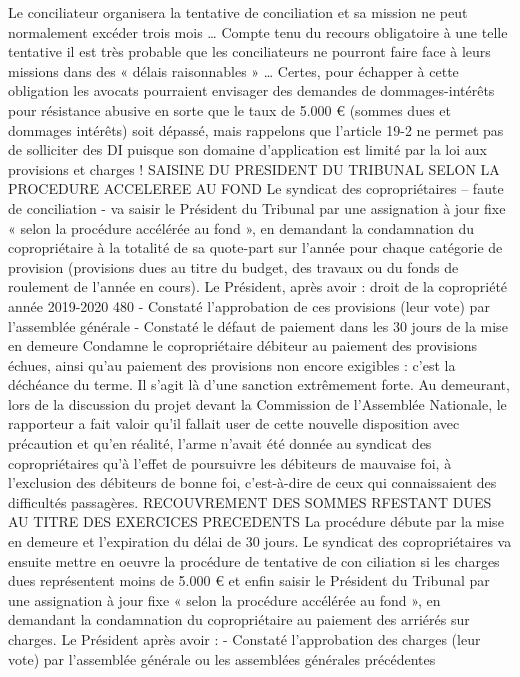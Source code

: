 Le conciliateur organisera la tentative de conciliation et sa mission ne peut normalement excéder trois mois …
Compte tenu du recours obligatoire à une telle tentative il est très probable que les conciliateurs ne pourront faire face à leurs missions dans des « délais raisonnables » …
Certes, pour échapper à cette obligation les avocats pourraient envisager des demandes de dommages-intérêts pour résistance abusive en sorte que le taux de 5.000 € (sommes dues et dommages intérêts) soit dépassé, mais rappelons que l’article 19-2 ne permet pas de solliciter des DI puisque son domaine d’application est limité par la loi aux provisions et charges !
SAISINE DU PRESIDENT DU TRIBUNAL SELON LA PROCEDURE ACCELEREE AU FOND
Le syndicat des copropriétaires – faute de conciliation - va saisir le Président du Tribunal par une assignation à jour fixe « selon la procédure accélérée au fond », en demandant la condamnation du copropriétaire à la totalité de sa quote-part sur l’année pour chaque catégorie de provision (provisions dues au titre du budget, des travaux ou du fonds de roulement de l’année en cours).
Le Président, après avoir :
droit de la copropriété année 2019-2020
480
- Constaté l’approbation de ces provisions (leur vote) par l’assemblée générale
- Constaté le défaut de paiement dans les 30 jours de la mise en demeure
Condamne le copropriétaire débiteur au paiement des provisions échues, ainsi qu’au paiement des provisions non encore exigibles : c’est la déchéance du terme.
Il s'agit là d'une sanction extrêmement forte. Au demeurant, lors de la discussion du projet devant la Commission de l'Assemblée Nationale, le rapporteur a fait valoir qu'il fallait user de cette nouvelle disposition avec précaution et qu'en réalité, l'arme n'avait été donnée au syndicat des copropriétaires qu'à l'effet de poursuivre les débiteurs de mauvaise foi, à l'exclusion des débiteurs de bonne foi, c’est-à-dire de ceux qui connaissaient des difficultés passagères.
RECOUVREMENT DES SOMMES RFESTANT DUES AU TITRE DES EXERCICES PRECEDENTS
La procédure débute par la mise en demeure et l’expiration du délai de 30 jours.
Le syndicat des copropriétaires va ensuite mettre en oeuvre la procédure de tentative de con ciliation si les charges dues représentent moins de 5.000 € et enfin saisir le Président du Tribunal par une assignation à jour fixe « selon la procédure accélérée au fond », en demandant la condamnation du copropriétaire au paiement des arriérés sur charges.
Le Président après avoir :
- Constaté l’approbation des charges (leur vote) par l’assemblée générale ou les assemblées générales précédentes
